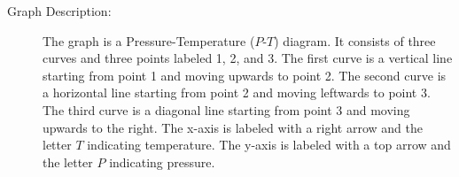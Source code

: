 

\item[(a)] 
    \begin{description}
        \item[Graph Description:] The graph is a Pressure-Temperature ($P$-$T$) diagram. It consists of three curves and three points labeled 1, 2, and 3. The first curve is a vertical line starting from point 1 and moving upwards to point 2. The second curve is a horizontal line starting from point 2 and moving leftwards to point 3. The third curve is a diagonal line starting from point 3 and moving upwards to the right. The x-axis is labeled with a right arrow and the letter $T$ indicating temperature. The y-axis is labeled with a top arrow and the letter $P$ indicating pressure.
    \end{description}
